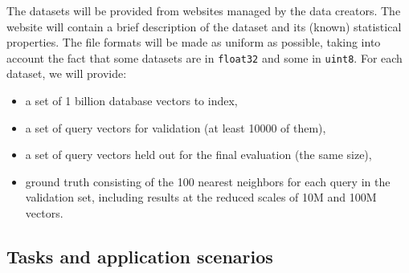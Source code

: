 The datasets will be provided from websites managed by the data creators. 
The website will contain a brief description of the dataset and its (known) statistical properties.
The file formats will be made as uniform as possible, taking into account the fact that some datasets are 
in \texttt{float32} and some in \texttt{uint8}.
For each dataset, we will provide: 
\begin{itemize}
\item 
	a set of 1 billion database vectors to index,
\item 
	a set of query vectors for validation (at least 10000 of them), 
\item 
	a set of query vectors held out for the final evaluation (the same size),
\item
	ground truth consisting of the 100 nearest neighbors for each query in the validation set, including results at the reduced scales of 10M and 100M vectors.
\end{itemize}





\subsection{Tasks and application scenarios}

